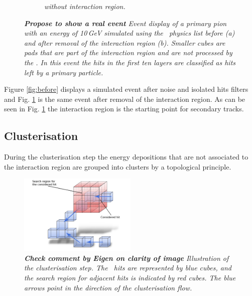 \begin{figure}
\begin{subfigure}{0.5\textwidth}
		\caption{\label{fig:after} \sl without interaction region.}
	\end{subfigure}
	\caption{ \sl {\bf Propose to show a real event} Event display of a primary pion with an energy of 10\,GeV simulated using the \ftfp\ physics list before \textit{(a)} and after removal of the interaction region \textit{(b)}. Smaller cubes are pads that are part of the interaction region and are not processed by the \tfa . In this event the hits in the first ten layers are classified as hits left by a primary particle.}
	
	\label{fig:test}
\end{figure}

Figure \ref{fig:before} displays a simulated event after noise and isolated hits filters and Fig. \ref{fig:after} is the same event after removal of the interaction region. As can be seen in Fig. \ref{fig:after} the interaction region is the starting point for secondary tracks.



\subsection{Clusterisation}\label{sec:cluster}
During the clusterisation step the energy depositions that are not associated to the interaction region are grouped into clusters by a topological principle. %

\begin{figure}
	\centering
	\includegraphics[width=0.5\textwidth]{ECAL/graphics/demo-v2.png}
	\caption{\label{fig:democluster} \sl {\bf Check comment by Eigen on clarity of image} Illustration of the clusterisation step. The \ecal\ hits are represented by blue cubes, and the search region for adjacent hits is indicated by red cubes. The blue arrows point in the direction of the clusterisation flow. }
\end{figure}

